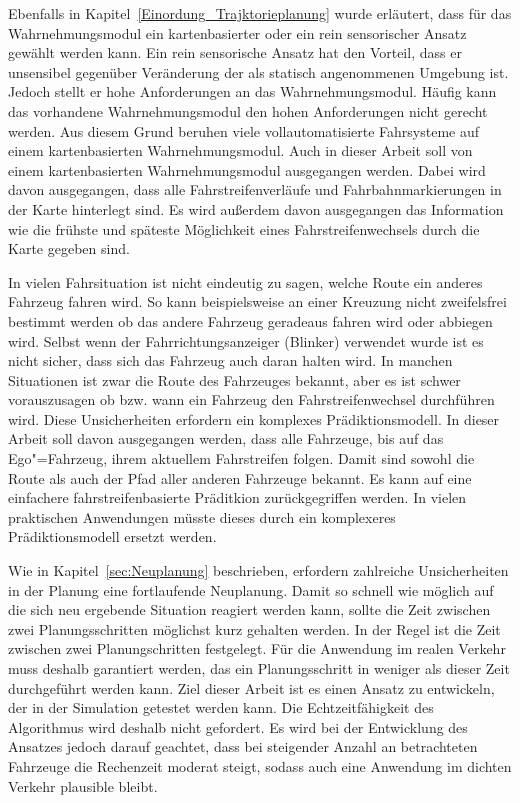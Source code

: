 Ebenfalls in Kapitel~\ref{Einordung_Trajktorieplanung} wurde erl\"autert, dass f\"ur das Wahrnehmungsmodul ein kartenbasierter oder ein rein sensorischer Ansatz gew\"ahlt werden kann.
Ein rein sensorische Ansatz hat den Vorteil, dass er unsensibel gegen\"uber Ver\"anderung der als statisch angenommenen Umgebung ist.
Jedoch stellt er hohe Anforderungen an das Wahrnehmungsmodul.
H\"aufig kann das vorhandene Wahrnehmungsmodul den hohen Anforderungen nicht gerecht werden.
Aus diesem Grund beruhen viele vollautomatisierte Fahrsysteme auf einem kartenbasierten Wahrnehmungsmodul.
Auch in dieser Arbeit soll von einem kartenbasierten Wahrnehmungsmodul ausgegangen werden.
Dabei wird davon ausgegangen, dass alle Fahrstreifenverl\"aufe und Fahrbahnmarkierungen in der Karte hinterlegt sind.
Es wird au{\ss}erdem davon ausgegangen das Information wie die fr\"uhste und sp\"ateste M\"oglichkeit eines Fahrstreifenwechsels durch die Karte gegeben sind.

In vielen Fahrsituation ist nicht eindeutig zu sagen, welche Route ein anderes Fahrzeug fahren wird.
So kann beispielsweise an einer Kreuzung nicht zweifelsfrei bestimmt werden ob das andere Fahrzeug geradeaus fahren wird oder abbiegen wird.
Selbst wenn der Fahrrichtungsanzeiger (Blinker) verwendet wurde ist es nicht sicher, dass sich das Fahrzeug auch daran halten wird.
In manchen Situationen ist zwar die Route des Fahrzeuges bekannt, aber es ist schwer vorauszusagen ob bzw. wann ein Fahrzeug den Fahrstreifenwechsel durchf\"uhren wird.
Diese Unsicherheiten erfordern ein komplexes Pr\"adiktionsmodell.
In dieser Arbeit soll davon ausgegangen werden, dass alle Fahrzeuge, bis auf das Ego"=Fahrzeug, ihrem aktuellem Fahrstreifen folgen.
Damit sind sowohl die Route als auch der Pfad aller anderen Fahrzeuge bekannt.
Es kann auf eine einfachere fahrstreifenbasierte Pr\"aditkion zur\"uckgegriffen werden.
In vielen praktischen Anwendungen m\"usste dieses durch ein komplexeres Pr\"adiktionsmodell ersetzt werden.

Wie in Kapitel~\ref{sec:Neuplanung} beschrieben, erfordern zahlreiche Unsicherheiten in der Planung eine fortlaufende Neuplanung.
Damit so schnell wie m\"oglich auf die sich neu ergebende Situation reagiert werden kann, sollte die Zeit zwischen zwei Planungsschritten m\"oglichst kurz gehalten werden.
In der Regel ist die Zeit zwischen zwei Planungschritten festgelegt.
F\"ur die Anwendung im realen Verkehr muss deshalb garantiert werden, das ein Planungsschritt in weniger als dieser Zeit durchgef\"uhrt werden kann.
Ziel dieser Arbeit ist es einen Ansatz zu entwickeln, der in der Simulation getestet werden kann.
Die Echtzeitf\"ahigkeit des Algorithmus wird deshalb nicht gefordert.
Es wird bei der Entwicklung des Ansatzes jedoch darauf geachtet, dass bei steigender Anzahl an betrachteten Fahrzeuge die Rechenzeit moderat steigt, sodass auch eine Anwendung im dichten Verkehr plausible bleibt.